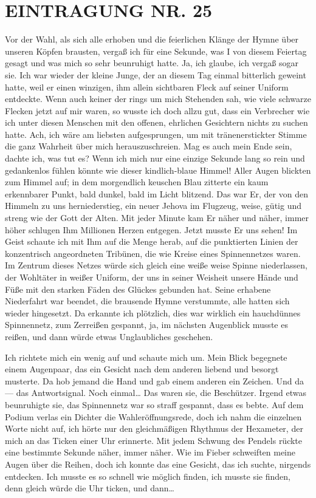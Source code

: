 \section{EINTRAGUNG NR. 25}

Vor der Wahl, als sich alle erhoben und die feierlichen Klänge der
Hymne über unseren Köpfen brausten, vergaß ich für eine Sekunde,
was I von diesem Feiertag gesagt und was mich so sehr beunruhigt
hatte. Ja, ich glaube, ich vergaß sogar sie. Ich war wieder der
kleine Junge, der an diesem Tag einmal bitterlich geweint hatte,
weil er einen winzigen, ihm allein sichtbaren Fleck auf seiner
Uniform entdeckte. Wenn auch keiner der rings um mich Stehenden
sah, wie viele schwarze Flecken jetzt auf mir waren, so wusste ich
doch allzu gut, dass ein Verbrecher wie ich unter diesen Menschen
mit den offenen, ehrlichen Gesichtern nichts zu suchen hatte. Ach,
ich wäre am liebsten aufgesprungen, um mit tränenerstickter Stimme
die ganz Wahrheit über mich herauszuschreien. Mag es auch mein Ende
sein, dachte ich, was tut es? Wenn ich mich nur eine einzige
Sekunde lang so rein und gedankenlos fühlen könnte wie dieser
kindlich-blaue Himmel! Aller Augen blickten zum Himmel auf; in dem
morgendlich keuschen Blau zitterte ein kaum erkennbarer Punkt, bald
dunkel, bald im Licht blitzend. Das war Er, der von den Himmeln zu
uns herniederstieg, ein neuer Jehova im Flugzeug, weise, gütig und
streng wie der Gott der Alten. Mit jeder Minute kam Er näher und
näher, immer höher schlugen Ihm Millionen Herzen entgegen. Jetzt
musste Er uns sehen! Im Geist schaute ich mit Ihm auf die Menge
herab, auf die punktierten Linien der konzentrisch angeordneten
Tribünen, die wie Kreise eines Spinnennetzes waren. Im Zentrum
dieses Netzes würde sich gleich eine
weiße weise Spinne niederlassen, der Wohltäter in weißer Uniform,
der uns in seiner Weisheit unsere Hände und Füße mit den starken
Fäden des Glückes gebunden hat. Seine erhabene Niederfahrt war
beendet, die brausende Hymne verstummte, alle hatten sich wieder
hingesetzt. Da erkannte ich plötzlich, dies war wirklich ein
hauchdünnes Spinnennetz, zum Zerreißen gespannt, ja, im nächsten
Augenblick musste es reißen, und dann würde etwas Unglaubliches
geschehen.

Ich richtete mich ein wenig auf und schaute mich um. Mein Blick
begegnete einem Augenpaar, das ein Gesicht nach dem anderen liebend
und besorgt musterte. Da hob jemand die Hand und gab einem anderen
ein Zeichen. Und da — das Antwortsignal. Noch einmal\ldots{} Das waren
sie, die Beschützer. Irgend etwas beunruhigte sie, das Spinnennetz
war so straff gespannt, dass es bebte. Auf dem Podium verlas ein
Dichter die Wahleröffnungsrede, doch ich nahm die einzelnen Worte
nicht auf, ich hörte nur den gleichmäßigen Rhythmus der Hexameter,
der mich an das Ticken einer Uhr erinnerte. Mit jedem Schwung des
Pendels rückte eine bestimmte Sekunde näher, immer näher. Wie im
Fieber schweiften meine Augen über die Reihen, doch ich konnte das
eine Gesicht, das ich suchte, nirgends entdecken. Ich musste es so
schnell wie möglich finden, ich musste sie finden, denn gleich
würde die Uhr ticken, und dann\ldots{}

